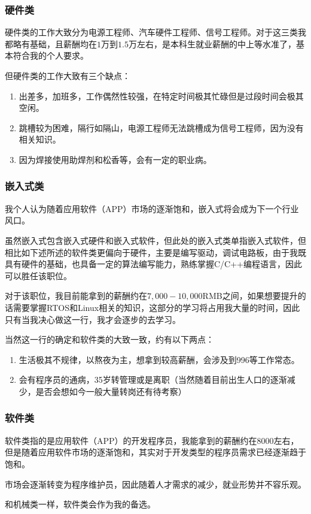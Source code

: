 \documentclass{ctexart}
\begin{document}
			\subsubsection{硬件类}
				硬件类的工作大致分为电源工程师、汽车硬件工程师、信号工程师。对于这三类我都略有基础，且薪酬均在$1$万到$1.5$万左右，是本科生就业薪酬的中上等水准了，基本符合我的个人要求。\par
				但硬件类的工作大致有三个缺点：
				\begin{enumerate}
					\item 出差多，加班多，工作偶然性较强，在特定时间极其忙碌但是过段时间会极其空闲。
					\item 跳槽较为困难，隔行如隔山，电源工程师无法跳槽成为信号工程师，因为没有相关知识。
					\item 因为焊接使用助焊剂和松香等，会有一定的职业病。
				\end{enumerate}
			\subsubsection{嵌入式类}
				我个人认为随着应用软件（APP）市场的逐渐饱和，嵌入式将会成为下一个行业风口。\par
				虽然嵌入式包含嵌入式硬件和嵌入式软件，但此处的嵌入式类单指嵌入式软件，但相比如下述所述的软件类更偏向于硬件，主要是编写驱动，调试电路板，由于我既具有硬件的基础，也具备一定的算法编写能力，熟练掌握C/C++编程语言，因此可以胜任该职位。\par
				对于该职位，我目前能拿到的薪酬约在$7,000-10,000$RMB之间，如果想要提升的话需要掌握RTOS和Linux相关的知识，这部分的学习将占用我大量的时间，因此只有当我决心做这一行，我才会逐步的去学习。\par
				当然这一行的确定和软件类的大致一致，约有以下两点：
				\begin{enumerate}
					\item 生活极其不规律，以熬夜为主，想拿到较高薪酬，会涉及到996等工作常态。
					\item 会有程序员的通病，35岁转管理或是离职（当然随着目前出生人口的逐渐减少，是否会想如今一般大量转岗还有待考察）
				\end{enumerate}
			\subsubsection{软件类}
				软件类指的是应用软件（APP）的开发程序员，我能拿到的薪酬约在$8000$左右，但是随着应用软件市场的逐渐饱和，其实对于开发类型的程序员需求已经逐渐趋于饱和。\par
				市场会逐渐转变为程序维护员，因此随着人才需求的减少，就业形势并不容乐观。\par
				和机械类一样，软件类会作为我的备选。
				
\end{document}
